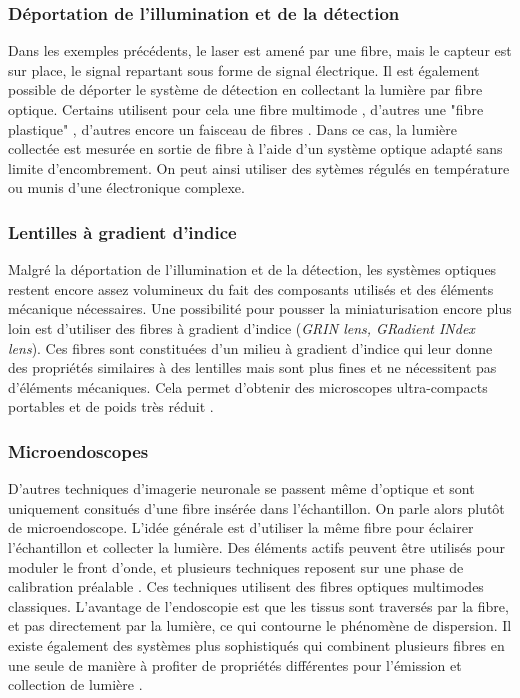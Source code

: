 \subsubsection{Déportation de l'illumination et de la détection}

Dans les exemples précédents, le laser est amené par une fibre, mais le capteur est sur place, le signal repartant sous forme de signal électrique. Il est également possible de déporter le système de détection en collectant la lumière par fibre optique. Certains utilisent pour cela une fibre multimode \cite{piyawattanametha_vivo_2009} \cite{sawinski_visually_2009}, d'autres une "fibre plastique" \cite{klioutchnikov_three-photon_2020}, d'autres encore un faisceau de fibres \cite{zong_fast_2017}. Dans ce cas, la lumière collectée est mesurée en sortie de fibre à l'aide d'un système optique adapté sans limite d'encombrement. On peut ainsi utiliser des sytèmes régulés en température ou munis d'une électronique complexe.

\subsubsection{Lentilles à gradient d'indice}

Malgré la déportation de l'illumination et de la détection, les systèmes optiques restent encore assez volumineux du fait des composants utilisés et des éléments mécanique nécessaires. Une possibilité pour pousser la miniaturisation encore plus loin est d'utiliser des fibres à gradient d'indice (\emph{GRIN lens, GRadient INdex lens}). Ces fibres sont constituées d'un milieu à gradient d'indice qui leur donne des propriétés similaires à des lentilles mais sont plus fines et ne nécessitent pas d'éléments mécaniques. Cela permet d'obtenir des microscopes ultra-compacts portables et de poids très réduit \cite{flusberg_vivo_2005}\cite{engelbrecht_ultra-compact_2008}.

\subsubsection{Microendoscopes}

D'autres techniques d'imagerie neuronale se passent même d'optique et sont uniquement consitués d'une fibre insérée dans l'échantillon. On parle alors plutôt de microendoscope. L'idée générale est d'utiliser la même fibre pour éclairer l'échantillon et collecter la lumière. Des éléments actifs peuvent être utilisés pour moduler le front d'onde, et plusieurs techniques reposent sur une phase de calibration préalable \cite{papadopoulos_high-resolution_2013}\cite{ohayon_minimally_2018}\cite{turtaev_high-fidelity_2018}. Ces techniques utilisent des fibres optiques multimodes classiques. L'avantage de l'endoscopie est que les tissus sont traversés par la fibre, et pas directement par la lumière, ce qui contourne le phénomène de dispersion. Il existe également des systèmes plus sophistiqués qui combinent plusieurs fibres en une seule de manière à profiter de propriétés différentes pour l'émission et collection de lumière \cite{andresen_two-photon_2013}\cite{kudlinski_double_2020}\cite{lombardini_high-resolution_2018}.



